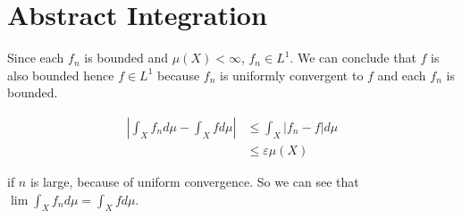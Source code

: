 \setcounter{section}{0}
\section{Abstract Integration}

\begin{problem}[10]
	\hfill

	Since each $f_n$ is bounded and $\mu\left( X \right) < \infty$, $f_n \in L^1$. We can conclude that $f$ is also bounded hence $f\in L^1$ because $f_n$ is uniformly convergent to $f$ and each $f_n$ is bounded.

	\begin{equation*}
		\begin{split}
			\left | \int _X f_n d\mu - \int _X f d\mu \right | & \leq
			\int_X \left | f_n - f \right | d\mu \\
			& \leq \varepsilon \mu\left( X \right)
		\end{split}
		\label{<+label+>}
	\end{equation*}

	if $n$ is large, because of uniform convergence. So we can see that $\lim \int_X f_n d\mu = \int_X f d\mu$.
\end{problem}

